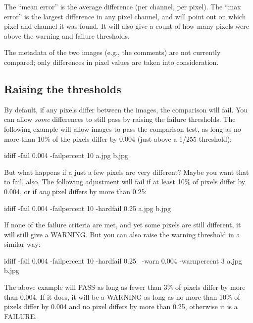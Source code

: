 
The ``mean error'' is the average difference (per channel, per pixel).
The ``max error'' is the largest difference in any pixel channel,
and will point out on which pixel and channel it was found.
It will also give a count of how many pixels were above the warning
and failure thresholds.

The metadata of the two images (e.g., the comments) are not currently
compared; only differences in pixel values are taken into consideration.

\subsection*{Raising the thresholds}

By default, if any pixels differ between the images, the comparison
will fail.  You can allow \emph{some} differences to still pass by
raising the failure thresholds.  The following example will allow
images to pass the comparison test, as long as no more than 10\%
of the pixels differ by 0.004 (just above a 1/255 threshold):

\begin{code}
    idiff -fail 0.004 -failpercent 10 a.jpg b.jpg
\end{code}

But what happens if a just a few pixels are very different?  Maybe you
want that to fail, also.  The following adjustment will fail if at least
10\% of pixels differ by 0.004, or if \emph{any} pixel differs by
more than 0.25:

\begin{code}
    idiff -fail 0.004 -failpercent 10 -hardfail 0.25 a.jpg b.jpg
\end{code}

If none of the failure criteria are met, and yet some pixels are 
still different, it will still give a WARNING.  But you can also
raise the warning threshold in a similar way:

\begin{code}
    idiff -fail 0.004 -failpercent 10 -hardfail 0.25 \
             -warn 0.004 -warnpercent 3 a.jpg b.jpg
\end{code}

\noindent The above example will PASS as long as fewer than 3\%
of pixels differ by more than 0.004.  If it does, it will be a
WARNING as long as no more than 10\% of pixels differ by 0.004
and no pixel differs by more than 0.25, otherwise it is a FAILURE.

